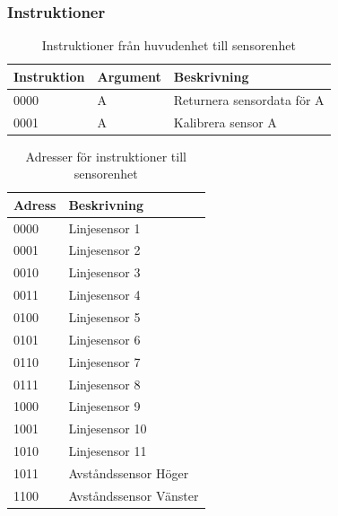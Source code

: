 \subsubsection{Instruktioner} \label{designspec:protokoll-huvud-sensor-instr}

\begin{table}[h]
	\centering
		\begin{tabularx}{\textwidth}{| l | l | X |}
			\hline
			\textbf{Instruktion} & \textbf{Argument} & \textbf{Beskrivning} \\
			\hline
			{0000} & {A} & {Returnera sensordata för A} \\
			\hline
			{0001} & {A} & {Kalibrera sensor A} \\
			\hline
		\end{tabularx}
	\caption{Instruktioner från huvudenhet till sensorenhet} \label{protokoll:huvud-sensor}
\end{table}

\begin{table}[h]
	\centering
		\begin{tabularx}{\textwidth}{| l | X |}
			\hline
			\textbf{Adress} & \textbf{Beskrivning} \\\hline
			{0000} & {Linjesensor 1} \\\hline
			{0001} & {Linjesensor 2} \\\hline
			{0010} & {Linjesensor 3} \\\hline
			{0011} & {Linjesensor 4} \\\hline
			{0100} & {Linjesensor 5} \\\hline
			{0101} & {Linjesensor 6} \\\hline
			{0110} & {Linjesensor 7} \\\hline
			{0111} & {Linjesensor 8} \\\hline
			{1000} & {Linjesensor 9} \\\hline
			{1001} & {Linjesensor 10} \\\hline
			{1010} & {Linjesensor 11} \\\hline
			{1011} & {Avståndssensor Höger} \\\hline
			{1100} & {Avståndssensor Vänster} \\\hline
		\end{tabularx}
	\caption{Adresser för instruktioner till sensorenhet} \label{protokoll:huvud-sensor-adress}
\end{table}

